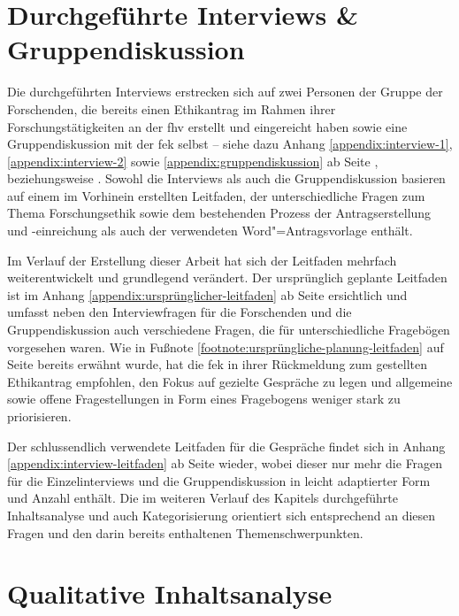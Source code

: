 \documentclass[a4paper,12pt,twoside]{scrreprt}
\begin{document}
\section{Durchgeführte Interviews \& Gruppendiskussion}
\label{sec:durchgeführte-interviews-gruppendiskussion}

Die durchgeführten Interviews erstrecken sich auf zwei Personen der Gruppe der Forschenden, die bereits einen Ethikantrag im Rahmen ihrer Forschungstätigkeiten an der \acl{fhv} erstellt und eingereicht haben sowie eine Gruppendiskussion mit der \ac{fek} selbst -- siehe dazu Anhang \ref{appendix:interview-1}, \ref{appendix:interview-2} sowie \ref{appendix:gruppendiskussion} ab Seite \pageref{appendix:interview-1}, \pageref{appendix:interview-2} beziehungsweise \pageref{appendix:gruppendiskussion}. Sowohl die Interviews als auch die Gruppendiskussion basieren auf einem im Vorhinein erstellten Leitfaden, der unterschiedliche Fragen zum Thema Forschungsethik sowie dem bestehenden Prozess der Antragserstellung und -einreichung als auch der verwendeten Word"=Antragsvorlage enthält.

\medskip

Im Verlauf der Erstellung dieser Arbeit hat sich der Leitfaden mehrfach weiterentwickelt und grundlegend verändert. Der ursprünglich geplante Leitfaden ist im Anhang \ref{appendix:ursprünglicher-leitfaden} ab Seite \pageref{appendix:ursprünglicher-leitfaden} ersichtlich und umfasst neben den Interviewfragen für die Forschenden und die Gruppendiskussion auch verschiedene Fragen, die für unterschiedliche Fragebögen vorgesehen waren. Wie in Fußnote \ref{footnote:ursprüngliche-planung-leitfaden} auf Seite \pageref{footnote:ursprüngliche-planung-leitfaden} bereits erwähnt wurde, hat die \ac{fek} in ihrer Rückmeldung zum gestellten Ethikantrag empfohlen, den Fokus auf gezielte Gespräche zu legen und allgemeine sowie offene Fragestellungen in Form eines Fragebogens weniger stark zu priorisieren.

Der schlussendlich verwendete Leitfaden für die Gespräche findet sich in Anhang \ref{appendix:interview-leitfaden} ab Seite \pageref{appendix:interview-leitfaden} wieder, wobei dieser nur mehr die Fragen für die Einzelinterviews und die Gruppendiskussion in leicht adaptierter Form und Anzahl enthält. Die im weiteren Verlauf des Kapitels durchgeführte Inhaltsanalyse und auch Kategorisierung orientiert sich entsprechend an diesen Fragen und den darin bereits enthaltenen Themenschwerpunkten.

\section{Qualitative Inhaltsanalyse}
\label{sec:qualitativer-inhaltsanalyse}
\end{document}
